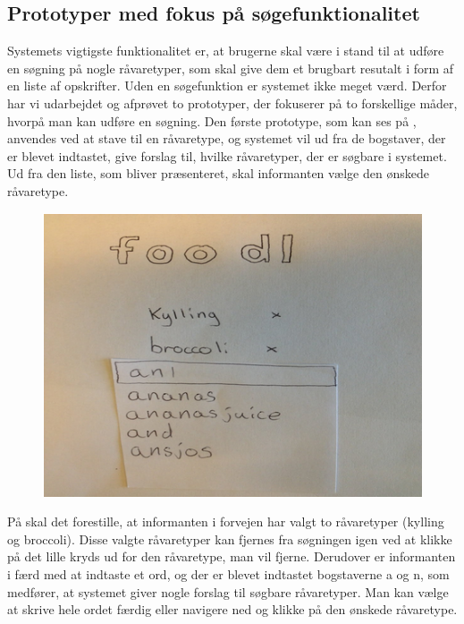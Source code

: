 \subsection{Prototyper med fokus på søgefunktionalitet}
\label{subsec:prototype1}

Systemets vigtigste funktionalitet er, at brugerne skal være i stand til at udføre en søgning på nogle råvaretyper, som skal give dem et brugbart resutalt i form af en liste af opskrifter. Uden en søgefunktion er systemet ikke meget værd. Derfor har vi udarbejdet og afprøvet to prototyper, der fokuserer på to forskellige måder, hvorpå man kan udføre en søgning. Den første prototype, som kan ses på , anvendes ved at stave til en råvaretype, og systemet vil ud fra de bogstaver, der er blevet indtastet, give forslag til, hvilke råvaretyper, der er søgbare i systemet. Ud fra den liste, som bliver præsenteret, skal informanten vælge den ønskede råvaretype.

\begin{figure}[H]
	\centering
	\includegraphics[scale=0.7]{billeder/prototyper/prototype1a.png}
	\label{fig:prototype1adesign}
\end{figure}

På  skal det forestille, at informanten i forvejen har valgt to råvaretyper (kylling og broccoli). Disse valgte råvaretyper kan fjernes fra søgningen igen ved at klikke på det lille kryds ud for den råvaretype, man vil fjerne. Derudover er informanten i færd med at indtaste et ord, og der er blevet indtastet bogstaverne a og n, som medfører, at systemet giver nogle forslag til søgbare råvaretyper. Man kan vælge at skrive hele ordet færdig eller navigere ned og klikke på den ønskede råvaretype.

